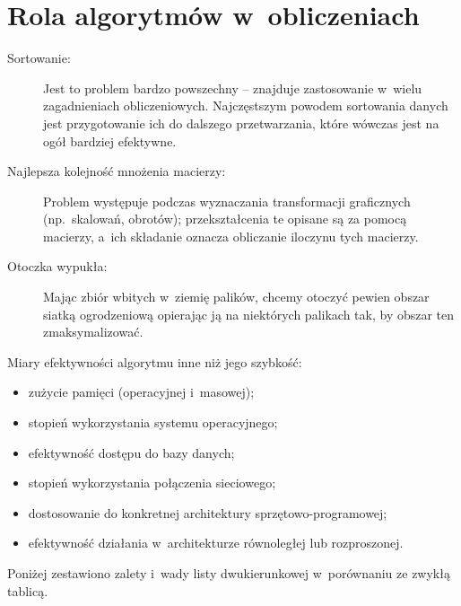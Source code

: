 \chapter{Rola algorytmów w~obliczeniach}


\exercise %
\begin{description}
	\item[Sortowanie:] Jest to problem bardzo powszechny -- znajduje zastosowanie w~wielu zagadnieniach obliczeniowych. Najczęstszym powodem sortowania danych jest przygotowanie ich do dalszego przetwarzania, które wówczas jest na ogół bardziej efektywne.
	\item[Najlepsza kolejność mnożenia macierzy:] Problem występuje podczas wyznaczania transformacji graficznych (np.\ skalowań, obrotów); przekształcenia te opisane są za pomocą macierzy, a~ich składanie oznacza obliczanie iloczynu tych macierzy.
	\item[Otoczka wypukła:] Mając zbiór wbitych w~ziemię palików, chcemy otoczyć pewien obszar siatką ogrodzeniową opierając ją na niektórych palikach tak, by obszar ten zmaksymalizować.
\end{description}

\exercise %
Miary efektywności algorytmu inne niż jego szybkość:
\begin{itemize}
	\item zużycie pamięci (operacyjnej i~masowej);
	\item stopień wykorzystania systemu operacyjnego;
	\item efektywność dostępu do bazy danych;
	\item stopień wykorzystania połączenia sieciowego;
	\item dostosowanie do konkretnej architektury sprzętowo-programowej;
	\item efektywność działania w~architekturze równoległej lub rozproszonej.
\end{itemize}

\exercise %
Poniżej zestawiono zalety i~wady listy dwukierunkowej w~porównaniu ze zwykłą tablicą.

